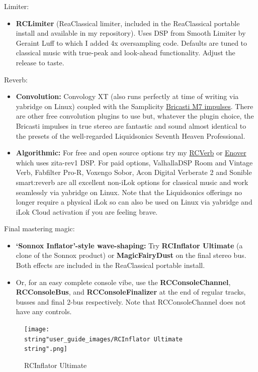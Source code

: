 \documentclass[10pt,american]{article}
\begin{document}
Limiter: 
\begin{itemize}
\item \textbf{RCLimiter} (ReaClassical limiter, included in the ReaClassical
portable install and available in my repository). Uses DSP from Smooth Limiter
by Geraint Luff to which I added 4x oversampling code. Defaults are tuned to
classical music with true-peak and look-ahead functionality. Adjust the release
to taste.
\end{itemize}
Reverb: 
\begin{itemize}
\item \textbf{Convolution:} Convology XT (also runs perfectly at time of writing
via yabridge on Linux) coupled with the Samplicity
\href{https://samplicity.com/bricasti-m7-impulse-response-files/}{Bricasti M7
impulses}. There are other free convolution plugins to use but, whatever the
plugin choice, the Bricasti impulses in true stereo are fantastic and sound
almost identical to the presets of the well-regarded Liquidsonics Seventh Heaven
Professional. 
\item \textbf{Algorithmic:} For free and open source options try my
\href{https://github.com/chmaha/RCverb/releases}{RCVerb} or
\href{https://github.com/chmaha/Enover/releases/tag/v0.9}{Enover} which uses
zita-rev1 DSP. For paid options, ValhallaDSP Room and Vintage Verb, Fabfilter
Pro-R, Voxengo Sobor, Acon Digital Verberate 2 and Sonible smart:reverb are all
excellent non-iLok options for classical music and work seamlessly via yabridge
on Linux. Note that the Liquidsonics offerings no longer require a physical iLok
so can also be used on Linux via yabridge and iLok Cloud activation if you are
feeling brave.
\end{itemize}
Final mastering magic:
\begin{itemize}
\item \textbf{`Sonnox Inflator'-style wave-shaping:} Try \textbf{RCInflator
Ultimate} (a clone of the Sonnox product) or \textbf{MagicFairyDust} on the
final stereo bus. Both effects are included in the ReaClassical portable
install.
\item Or, for an easy complete console vibe, use the \textbf{RCConsoleChannel},
\textbf{RCConsoleBus}, and \textbf{RCConsoleFinalizer} at the end of regular
tracks, busses and final 2-bus respectively. Note that RCConsoleChannel does not
have any controls.
\end{itemize}
\begin{figure}
\begin{centering}
\texttt{[image: \\string"user\_guide\_images/RCInflator Ultimate\\string".png]}
\par\end{centering}
\caption{RCInflator Ultimate}

\end{figure}
\end{document}
